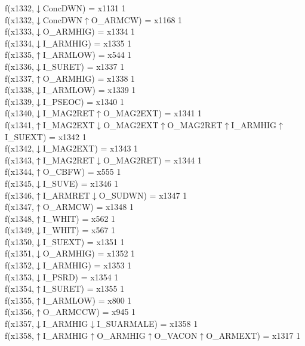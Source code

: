 f(x1332,$\downarrow$ConcDWN) = x1131 {1} \\
f(x1332,$\downarrow$ConcDWN$\uparrow$O\_ARMCW) = x1168 {1} \\
f(x1333,$\downarrow$O\_ARMHIG) = x1334 {1} \\
f(x1334,$\downarrow$I\_ARMHIG) = x1335 {1} \\
f(x1335,$\uparrow$I\_ARMLOW) = x544 {1} \\
f(x1336,$\downarrow$I\_SURET) = x1337 {1} \\
f(x1337,$\uparrow$O\_ARMHIG) = x1338 {1} \\
f(x1338,$\downarrow$I\_ARMLOW) = x1339 {1} \\
f(x1339,$\downarrow$I\_PSEOC) = x1340 {1} \\
f(x1340,$\downarrow$I\_MAG2RET$\uparrow$O\_MAG2EXT) = x1341 {1} \\
f(x1341,$\uparrow$I\_MAG2EXT$\downarrow$O\_MAG2EXT$\uparrow$O\_MAG2RET$\uparrow$I\_ARMHIG$\uparrow$I\_SUEXT) = x1342 {1} \\
f(x1342,$\downarrow$I\_MAG2EXT) = x1343 {1} \\
f(x1343,$\uparrow$I\_MAG2RET$\downarrow$O\_MAG2RET) = x1344 {1} \\
f(x1344,$\uparrow$O\_CBFW) = x555 {1} \\
f(x1345,$\downarrow$I\_SUVE) = x1346 {1} \\
f(x1346,$\uparrow$I\_ARMRET$\downarrow$O\_SUDWN) = x1347 {1} \\
f(x1347,$\uparrow$O\_ARMCW) = x1348 {1} \\
f(x1348,$\uparrow$I\_WHIT) = x562 {1} \\
f(x1349,$\downarrow$I\_WHIT) = x567 {1} \\
f(x1350,$\downarrow$I\_SUEXT) = x1351 {1} \\
f(x1351,$\downarrow$O\_ARMHIG) = x1352 {1} \\
f(x1352,$\downarrow$I\_ARMHIG) = x1353 {1} \\
f(x1353,$\downarrow$I\_PSRD) = x1354 {1} \\
f(x1354,$\uparrow$I\_SURET) = x1355 {1} \\
f(x1355,$\uparrow$I\_ARMLOW) = x800 {1} \\
f(x1356,$\uparrow$O\_ARMCCW) = x945 {1} \\
f(x1357,$\downarrow$I\_ARMHIG$\downarrow$I\_SUARMALE) = x1358 {1} \\
f(x1358,$\uparrow$I\_ARMHIG$\uparrow$O\_ARMHIG$\uparrow$O\_VACON$\uparrow$O\_ARMEXT) = x1317 {1} \\
